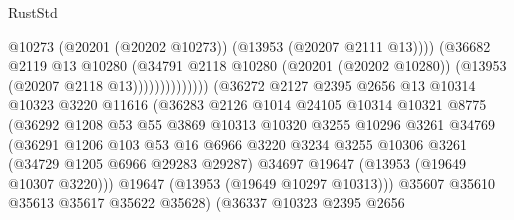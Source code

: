 \begin{lexlean}{RustStd}
\begin{coremodule}
                                              @10273
                                              (@20201 (@20202 @10273))
                                              (@13953 (@20207 @2111 @13))))
                                          (@36682
                                            @2119
                                            @13
                                            @10280
                                            (@34791
                                              @2118
                                              @10280
                                              (@20201 (@20202 @10280))
                                              (@13953 (@20207 @2118 @13))))))))))))))
                      (@36272
                        @2127
                        @2395
                        @2656
                        @13
                        @10314
                        @10323
                        @3220
                        @11616
                        (@36283
                          @2126
                          @1014
                          @24105
                          @10314
                          @10321
                          @8775
                          (@36292
                            @1208
                            @53
                            @55
                            @3869
                            @10313
                            @10320
                            @3255
                            @10296
                            @3261
                            @34769
                            (@36291
                              @1206
                              @103
                              @53
                              @16
                              @6966
                              @3220
                              @3234
                              @3255
                              @10306
                              @3261
                              (@34729 @1205 @6966 @29283 @29287)
                              @34697
                              @19647
                              (@13953 (@19649 @10307 @3220)))
                            @19647
                            (@13953 (@19649 @10297 @10313)))
                          @35607
                          @35610
                          @35613
                          @35617
                          @35622
                          @35628)
                        (@36337
                          @10323
                          @2395
                          @2656

\end{coremodule}
\end{lexlean}
